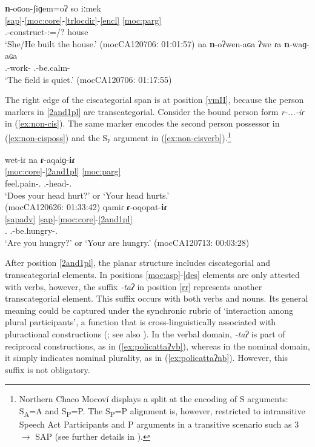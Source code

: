 \documentclass[output=paper]{langscibook}
\begin{document}
\ea
\ea \label{ex:policverb}
\glll \textbf{n}-oɢon-ʃiɡem=oʔ so iːmek\\
\ref{sap}-\ref{moc:core}-\ref{trlocdir}-\ref{encl} \ref{moc:parg} \\
{\Third.\III}-construct-{\Dir:\Up}={\Tprl/\Evid}? {\DetTwo} house\\
\glt `She/He built the house.' \hfill (mocCA120706ː 01ː01ː57)
\ex\label{ex:policnoun}
\gll na \textbf{n}-oʔwen-aɢa ʔwe ɾa \textbf{n}-waɡ-aɢa\\
{\DetThree} {\Poss.\Ind}-work-{\Nmlz} {\Exist} {\DetFour} {\Poss.\Ind}-be.calm-{\Nmlz}\\
\glt `The field is quiet.' \hfill(mocCA120706ː 01ː17ː55)
\z
\z

The right edge of the ciscategorial span is at position \ref{vmII}, because the person markers in \ref{2and1pl} are transcategorial. Consider the bound person form \textit{r-...-iɾ} in (\ref{ex:non-cis}). The same marker encodes the second person possessor in (\ref{ex:non-cisposs}) and the S\textsubscript{\textsc{p}} argument in (\ref{ex:non-cisverb}).\footnote{Northern Chaco Mocoví displays a split at the encoding of S arguments: S\textsubscript{\textsc{A}}=A and S\textsubscript{\textsc{P}}=P. The S\textsubscript{\textsc{P}}=P alignment is, however, restricted to intransitive Speech Act Participants and P arguments in a transitive scenario such as 3 $\rightarrow$ SAP (see further details in \citealt[chap.3]{Juarez2013}).}

\ea \label{ex:non-cis}
\ea \label{ex:non-cisposs}
\glll wet-iɾ na \textbf{ɾ}-aqaiɡ-\textbf{iɾ}\\
    \ref{moc:core}-\ref{2and1pl}  \ref{moc:parg} \\
    feel.pain-{\Second.\II} {\DetThree} {\Second\Sg.\Poss}-head-{\Second\Sg.\Poss}\\
\glt `Does your head hurt?' or `Your head hurts.'\\
\hfill (mocCA120626: 01:33:42)
\ex\label{ex:non-cisverb}
\glll qamiɾ  \textbf{ɾ}-oqopat-\textbf{iɾ}\\
    \ref{sapadv} \ref{sap}-\ref{moc:core}-\ref{2and1pl}  \\
    {\Second\Sg.\Pron} {\Second\Sg.\I}-be.hungry-{\Second\Sg.\I}\\
\glt `Are you hungry?' or `Your are hungry.'
\hfill (mocCA120713: 00:03:28)
\z
\z

After position \ref{2and1pl}, the planar structure includes ciscategorial and transcategorial elements.  In positions \ref{moc:asp}-\ref{des} elements are only attested with verbs, however, the suffix \textit{-taʔ} in position \ref{rr} represents another transcategorial element. This suffix occurs with both verbs and nouns. Its general meaning could be captured under the synchronic rubric of `interaction among plural participants', a function that is cross-linguistically associated with pluractional constructions (\citealt[21--40]{Mattiola2019}; see also \citealt[chap. 6]{Juarezb}). In the verbal domain, \textit{-taʔ} is part of reciprocal constructions, as in (\ref{ex:policattaʔvb}), whereas in the nominal domain, it simply indicates nominal plurality, as in (\ref{ex:policattaʔnb}).
However, this suffix is not obligatory. 
\end{document}
